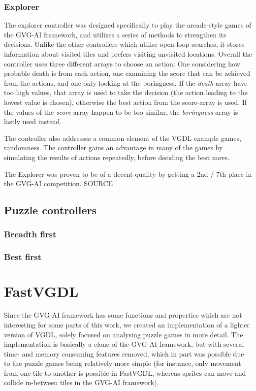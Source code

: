 \documentclass[a4paper,titlepage,final]{report}
\begin{document}
\subsubsection*{Explorer}
The explorer controller was designed specifically to play the arcade-style games of the GVG-AI framework, and utilizes a series of methods to strengthen its decisions. 
Unlike the other controllers which utilise open-loop searches, it stores information about visited tiles and prefers visiting unvisited locations. 
Overall the controller uses three different arrays to choose an action: One considering how probable death is from each action, one examining the score that can be achieved from the actions, and one only looking at the boringness.
If the \textit{death}-array have too high values, that array is used to take the decision (the action leading to the lowest value is chosen), otherwise the best action from the score-array is used.
If the values of the \textit{score}-array happen to be too similar, the \textit{boringness}-array is lastly used instead.

The controller also addresses a common element of the VGDL example games, randomness. The controller gains an advantage in many of the games by simulating the results of actions repeatedly, before deciding the best move.

The Explorer was proven to be of a decent quality by getting a 2nd / 7th place in the GVG-AI competition. SOURCE

\subsection{Puzzle controllers}

\subsubsection*{Breadth first}

\subsubsection*{Best first}



\section{FastVGDL}
\label{sec_fastvgdl}
Since the GVG-AI framework has some functions and properties which are not interesting for some parts of this work, we created an implementation of a lighter version of VGDL, solely focused on analysing puzzle games in more detail.
The implementation is basically a clone of the GVG-AI framework, but with several time- and memory consuming features removed, which in part was possible due to the puzzle games being relatively more simple (for instance, only movement from one tile to another is possible in FastVGDL, whereas sprites can move and collide in-between tiles in the GVG-AI framework).
\end{document}
